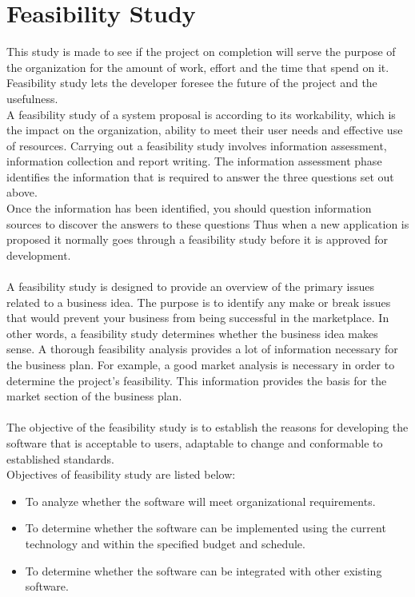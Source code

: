 
\section{Feasibility Study}
This study is made to see if the project on completion will serve the purpose of the organization for the amount of work, effort and the time that spend on it. Feasibility study lets the developer foresee the future of the project and the usefulness.\\
A feasibility study of a system proposal is according to its workability, which is the impact on the organization, ability to meet their user needs and effective use of resources. Carrying out a feasibility study involves information assessment, information collection and report writing. The information assessment phase identifies the information that is required to answer the three questions set out above.\\
Once the information has been identified, you should question information sources to discover the answers to these questions Thus when a new application is proposed it normally goes through a feasibility study before it is approved for development.\\\\
A feasibility study is designed to provide an overview of the primary issues related to a business idea. The purpose is to identify any make or break issues that would prevent your business from being successful in the marketplace. In other words, a feasibility study determines whether the business idea makes sense. A thorough feasibility analysis provides a lot of information necessary for the business plan. For example, a good market analysis is necessary in order to determine the project's feasibility. This information provides the basis for the market section of the business plan.\\\\
The objective of the feasibility study is to establish the reasons for developing the software that is acceptable to users, adaptable to change and conformable to established standards.\\
Objectives of feasibility study are listed below:
\begin{itemize}
	\item To analyze whether the software will meet organizational requirements.
	\item To determine whether the software can be implemented using the current technology and within the specified budget and schedule.
	\item To determine whether the software can be integrated with other existing software.
\end{itemize}

